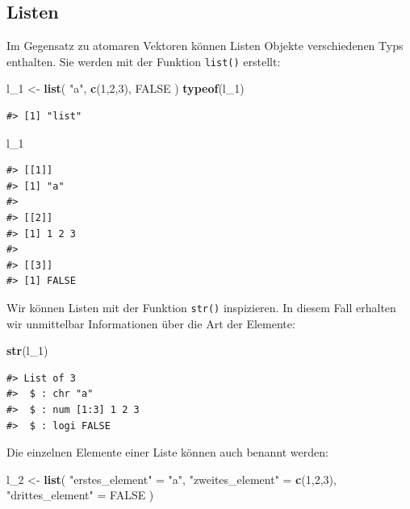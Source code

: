 \documentclass[]{book}
\newenvironment{Shaded}{\begin{snugshade}}{\end{snugshade}}
\newcommand{\KeywordTok}[1]{\textcolor[rgb]{0.13,0.29,0.53}{\textbf{#1}}}
\newcommand{\DecValTok}[1]{\textcolor[rgb]{0.00,0.00,0.81}{#1}}
\newcommand{\StringTok}[1]{\textcolor[rgb]{0.31,0.60,0.02}{#1}}
\newcommand{\OtherTok}[1]{\textcolor[rgb]{0.56,0.35,0.01}{#1}}
\newcommand{\NormalTok}[1]{#1}
\begin{document}
\subsection{Listen}\label{listen}

Im Gegensatz zu atomaren Vektoren können Listen Objekte verschiedenen
Typs enthalten. Sie werden mit der Funktion \texttt{list()} erstellt:

\begin{Shaded}
\begin{Highlighting}[]
\NormalTok{l_}\DecValTok{1}\NormalTok{ <-}\StringTok{ }\KeywordTok{list}\NormalTok{(}
  \StringTok{"a"}\NormalTok{,}
  \KeywordTok{c}\NormalTok{(}\DecValTok{1}\NormalTok{,}\DecValTok{2}\NormalTok{,}\DecValTok{3}\NormalTok{),}
  \OtherTok{FALSE}
\NormalTok{)}
\KeywordTok{typeof}\NormalTok{(l_}\DecValTok{1}\NormalTok{)}
\end{Highlighting}
\end{Shaded}

\begin{verbatim}
#> [1] "list"
\end{verbatim}

\begin{Shaded}
\begin{Highlighting}[]
\NormalTok{l_}\DecValTok{1}
\end{Highlighting}
\end{Shaded}

\begin{verbatim}
#> [[1]]
#> [1] "a"
#> 
#> [[2]]
#> [1] 1 2 3
#> 
#> [[3]]
#> [1] FALSE
\end{verbatim}

Wir können Listen mit der Funktion \texttt{str()} inspizieren. In diesem
Fall erhalten wir unmittelbar Informationen über die Art der Elemente:

\begin{Shaded}
\begin{Highlighting}[]
\KeywordTok{str}\NormalTok{(l_}\DecValTok{1}\NormalTok{)}
\end{Highlighting}
\end{Shaded}

\begin{verbatim}
#> List of 3
#>  $ : chr "a"
#>  $ : num [1:3] 1 2 3
#>  $ : logi FALSE
\end{verbatim}

Die einzelnen Elemente einer Liste können auch benannt werden:

\begin{Shaded}
\begin{Highlighting}[]
\NormalTok{l_}\DecValTok{2}\NormalTok{ <-}\StringTok{ }\KeywordTok{list}\NormalTok{(}
  \StringTok{"erstes_element"}\NormalTok{ =}\StringTok{ "a"}\NormalTok{,}
  \StringTok{"zweites_element"}\NormalTok{ =}\StringTok{ }\KeywordTok{c}\NormalTok{(}\DecValTok{1}\NormalTok{,}\DecValTok{2}\NormalTok{,}\DecValTok{3}\NormalTok{),}
  \StringTok{"drittes_element"}\NormalTok{ =}\StringTok{ }\OtherTok{FALSE}
\NormalTok{)}
\end{Highlighting}
\end{Shaded}
\end{document}
